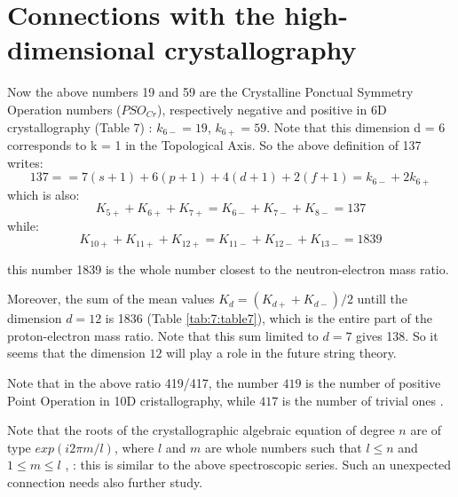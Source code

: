 \documentclass[a4paper,9pt]{article}
\begin{document}
 \section{Connections with the high-dimensional crystallography}
 
 Now the above numbers 19 and 59 are the Crystalline Ponctual Symmetry Operation numbers ($PSO_{Cr}$), respectively negative and positive in 6D crystallography \cite{Weigel} (Table 7) : $k_{6-} = 19$, $k_{6+} = 59$. Note that this dimension d = 6 corresponds to k = 1 in the Topological Axis. So the above definition of 137 writes:
  \begin{equation}
   137 =   = 7(s +1) + 6(p +1) + 4(d +1) + 2(f +1) = k_{6-} + 2k_{6+}   
    \end{equation}
    which is also:
    \begin{equation}
    K_{5+}+K_{6+}+K_{7+} = K_{6-} + K_{7-} +K_{8-} = 137   
    \end{equation}
    while:
    \begin{equation}
    K_{10+} +K_{11+}+K_{12+} = K_{11-} +K_{12-}+K_{13-} = 1839   
    \end{equation}
    
    this number 1839 is the whole number closest to the neutron-electron mass ratio.
    
    Moreover, the sum of the mean values $K_{d} = (K_{d+} + K_{d-})/2$ untill the dimension $d = 12$ is 1836 (Table \ref{tab:7:table7}), which is the entire part of the proton-electron mass ratio. Note that this sum limited to $d = 7$ gives 138. So it seems that the dimension $12$ will play a role in the future string theory.
    
    
    Note that in the  above ratio 419/417, the number $419$ is the number of positive Point Operation in 10D cristallography, while $417$ is the number of trivial ones .
    
    
    Note that the roots of the crystallographic algebraic equation of degree $n$ are of type $exp(i2\pi m/l)$, where $l$ and $m$ are whole numbers such that $ l \leq n $ and $ 1 \leq m \leq l $ ,  : this is similar to the above spectroscopic series. Such an unexpected connection needs also further study.   
\end{document}
